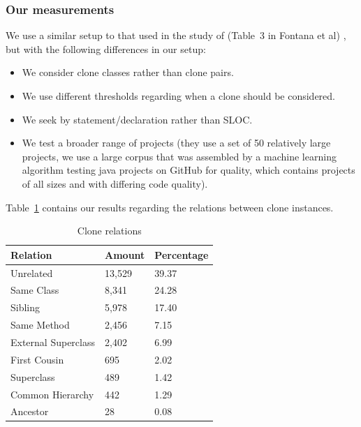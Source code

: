 \documentclass[a4paper]{article}
\begin{document}
\subsubsection{Our measurements}
We use a similar setup to that used in the study of   (Table~3 in Fontana et al) \cite{fontana2015duplicated}, but with the following differences in our setup:
\begin{itemize}
  \item We consider clone classes rather than clone pairs.
\item We use different thresholds regarding when a clone should be considered.
\item We seek by statement/declaration rather than SLOC.
\item We test a broader range of projects (they use a set of 50 relatively large projects, we use a large corpus that was assembled by a machine learning algorithm testing java projects on GitHub for quality, which contains projects of all sizes and with differing code quality).
\end{itemize}

Table~\ref{table:relations} contains our results regarding the relations between clone instances.

\begin{table}[H]
  \begin{center}
  \caption{Clone relations} \label{table:relations}
  \bigskip
\begin{tabular}{|l|l|l|} \hline
\textbf{Relation}  & \textbf{Amount} & \textbf{Percentage} \\ \hline
Unrelated          & 13,529           & 39.37               \\ \hline
Same Class          & 8,341            & 24.28               \\ \hline
Sibling            & 5,978            & 17.40               \\ \hline
Same Method         & 2,456            & 7.15                \\ \hline
External Superclass & 2,402            & 6.99                \\ \hline
First Cousin        & 695             & 2.02                \\ \hline
Superclass         & 489             & 1.42                \\ \hline
Common Hierarchy    & 442             & 1.29                \\ \hline
Ancestor           & 28              & 0.08               \\ \hline
\end{tabular}
\end{center}
\end{table}
\end{document}

